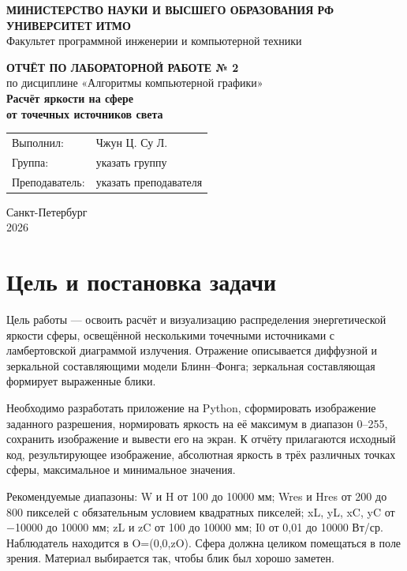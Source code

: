 \documentclass[a4paper,12pt]{article}
\newcommand{\studentname}{Чжун Ц. Су Л.}
\newcommand{\studentgroup}{указать группу}
\newcommand{\teachername}{указать преподавателя}
\newcommand{\reportyear}{2026}
\begin{document}
\begin{titlepage}
  \thispagestyle{empty}
  \begin{center}
    \textbf{МИНИСТЕРСТВО НАУКИ И ВЫСШЕГО ОБРАЗОВАНИЯ РФ}\\[0.6em]
    \textbf{УНИВЕРСИТЕТ ИТМО}\\[0.6em]
    Факультет программной инженерии и компьютерной техники

    \vfill

    {\Large\bfseries ОТЧЁТ ПО ЛАБОРАТОРНОЙ РАБОТЕ № 2}\\[1.2em]
    {\large по дисциплине «Алгоритмы компьютерной графики»}\\[2em]
    {\Large\bfseries Расчёт яркости на сфере\\
    от точечных источников света}

    \vfill

    \begin{tabular}{@{}ll@{}}
      Выполнил: & \studentname \\
      Группа: & \studentgroup \\
      Преподаватель: & \teachername
    \end{tabular}

    \vfill
    Санкт-Петербург\\
    \reportyear
  \end{center}
\end{titlepage}

\tableofcontents
\newpage

\section{Цель и постановка задачи}
Цель работы — освоить расчёт и визуализацию распределения энергетической яркости сферы, освещённой несколькими точечными источниками с ламбертовской диаграммой излучения. Отражение описывается диффузной и зеркальной составляющими модели Блинн–Фонга; зеркальная составляющая формирует выраженные блики.

Необходимо разработать приложение на Python, сформировать изображение заданного разрешения, нормировать яркость на её максимум в диапазон 0–255, сохранить изображение и вывести его на экран. К отчёту прилагаются исходный код, результирующее изображение, абсолютная яркость в трёх различных точках сферы, максимальное и минимальное значения.

Рекомендуемые диапазоны: W и H от 100 до 10000 мм; Wres и Hres от 200 до 800 пикселей с обязательным условием квадратных пикселей; xL, yL, xC, yC от \ensuremath{-}10000 до 10000 мм; zL и zC от 100 до 10000 мм; I0 от 0,01 до 10000 Вт/ср. Наблюдатель находится в O=(0,0,zO). Сфера должна целиком помещаться в поле зрения. Материал выбирается так, чтобы блик был хорошо заметен.
\end{document}
